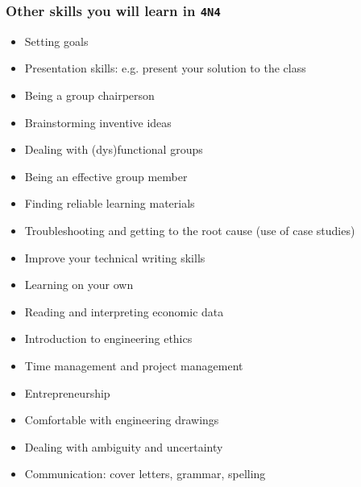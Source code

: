 \begin{frame}\frametitle{Other skills you will learn in \texttt{4N4}}
	\begin{itemize}
		\item	Setting goals
		\item	Presentation skills: e.g. present your solution to the class
		\item	Being a group chairperson
		\item	Brainstorming inventive ideas
		\item	Dealing with (dys)functional groups
		\item	Being an effective group member
		\item	Finding reliable learning materials
		\item	Troubleshooting and getting to the root cause {\scriptsize (use of case studies)}
		\item	Improve your technical writing skills
		\item	Learning on your own
		\item	Reading and interpreting economic data
		\item	Introduction to engineering ethics
		\item	Time management and project management
		\item	Entrepreneurship
		\item	Comfortable with engineering drawings
		\item	Dealing with ambiguity and uncertainty
		\item	Communication: cover letters, grammar, spelling
	\end{itemize}
\end{frame}

